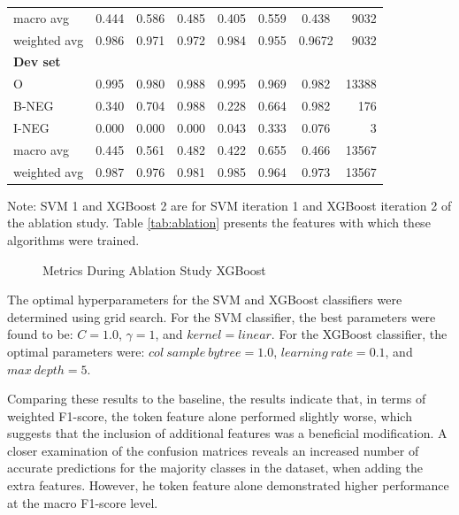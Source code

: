 \begin{table}[!ht]
\begin{tabular}{lccc|cccr}
macro avg          &  0.444 &  0.586 &  0.485 & 0.405 & 0.559 & 0.438 & 9032 \\
weighted avg       &  0.986 &  0.971 &  0.972 & 0.984 & 0.955 & 0.9672 & 9032 \\
\hline
\textbf{Dev set}   &        &        &        &       &       & &   \\
O                  &  0.995 &  0.980 &  0.988 & 0.995 & 0.969 & 0.982 & 13388 \\
B-NEG              &  0.340 &  0.704 &  0.988 & 0.228 & 0.664 & 0.982 & 176 \\
I-NEG              &  0.000 &  0.000 &  0.000 & 0.043 & 0.333 & 0.076 & 3 \\
macro avg          &  0.445 &  0.561 &  0.482 & 0.422 & 0.655 & 0.466 & 13567 \\
weighted avg       &  0.987 &  0.976 &  0.981 & 0.985 & 0.964 & 0.973 & 13567 \\
\hline
\end{tabular}
\small

{Note:} SVM 1 and XGBoost 2 are for SVM iteration 1 and XGBoost iteration 2 of the ablation study. Table \ref{tab:ablation} presents the features with which these algorithms were trained.
\end{table}



\begin{figure}[!ht]
\centering
  \caption{Metrics During Ablation Study XGBoost}
  \label{fig:metrics_xgb_training}
\end{figure}

The optimal hyperparameters for the SVM and XGBoost classifiers were determined using grid search. For the SVM classifier, the best parameters were found to be: $ C = 1.0 $, $ \gamma = 1 $, and $ kernel = linear $.  For the XGBoost classifier, the optimal parameters were: $col \ sample \ bytree= 1.0$, $learning \ rate = 0.1$, and $max \ depth = 5$.

Comparing these results to the baseline, the results indicate that, in terms of weighted F1-score, the token feature alone performed slightly worse, which suggests that the inclusion of additional features was a beneficial modification. A closer examination of the confusion matrices reveals an increased number of accurate predictions for the majority classes in the dataset, when adding the extra features. However, he token feature alone demonstrated higher performance at the macro F1-score level.